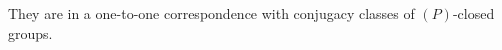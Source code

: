 \documentclass[preview]{standalone}
\begin{document}
\begin{center}
They are in a one-to-one correspondence with conjugacy classes of $(P)$-closed groups.
\end{center}
\end{document}

